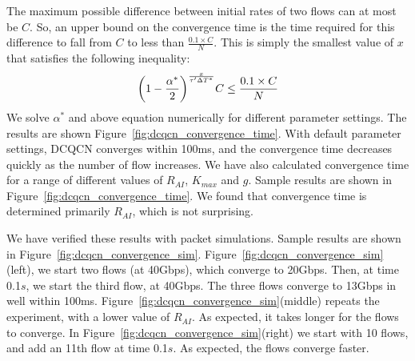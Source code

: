 The maximum possible difference between initial rates of two flows can at most
be $C$. So, an upper bound on the convergence time is the time required for this
difference to fall from $C$ to less than $\frac{0.1 \times C}{N}$. This is
simply the smallest value of $x$ that satisfies the following inequality: 
\begin{equation} 
\small 
{ \left( {1 - \frac{{{\alpha ^*}}}{2}} \right)^{\frac{x}{{\tau '\Delta{T^*}}}}}C \le \frac{0.1 \times C}{N} 
\end{equation}
We solve $\alpha^*$ and above equation numerically for different parameter
settings. The results are shown Figure~\ref{fig:dcqcn_convergence_time}. With
default parameter settings, DCQCN converges within 100ms, and the convergence
time decreases quickly as the number of flow increases.  We have also calculated
convergence time for a range of different values of $R_{AI}$, $K_{max}$ and $g$.
Sample results are shown in Figure~\ref{fig:dcqcn_convergence_time}. We found
that convergence time is determined primarily $R_{AI}$, which is not surprising.

We have verified these results with packet simulations. Sample results are shown
in Figure~\ref{fig:dcqcn_convergence_sim}.
Figure~\ref{fig:dcqcn_convergence_sim}(left), we start two flows (at 40Gbps), which
converge to 20Gbps. Then, at time 0.1$s$, we start the third flow, at 40Gbps.  The
three flows converge to 13Gbps in well within 100ms.
Figure~\ref{fig:dcqcn_convergence_sim}(middle) repeats the experiment, with a lower
value of $R_{AI}$. As expected, it takes longer for the flows to converge. In
Figure~\ref{fig:dcqcn_convergence_sim}(right) we start with 10 flows, and add an
11th flow at time 0.1$s$. As expected, the flows converge faster.
\fi